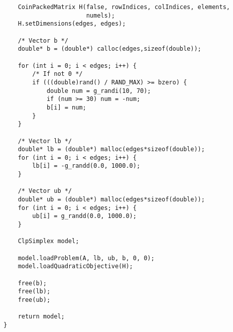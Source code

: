 \begin{verbatim}
    CoinPackedMatrix H(false, rowIndices, colIndices, elements,
                       numels);
    H.setDimensions(edges, edges);

    /* Vector b */
    double* b = (double*) calloc(edges,sizeof(double));

    for (int i = 0; i < edges; i++) {
        /* If not 0 */
        if (((double)rand() / RAND_MAX) >= bzero) {
            double num = g_randi(10, 70);
            if (num >= 30) num = -num;
            b[i] = num;
        }
    }

    /* Vector lb */
    double* lb = (double*) malloc(edges*sizeof(double));
    for (int i = 0; i < edges; i++) {
        lb[i] = -g_randd(0.0, 1000.0);
    }

    /* Vector ub */
    double* ub = (double*) malloc(edges*sizeof(double));
    for (int i = 0; i < edges; i++) {
        ub[i] = g_randd(0.0, 1000.0);
    }

    ClpSimplex model;

    model.loadProblem(A, lb, ub, b, 0, 0);
    model.loadQuadraticObjective(H);

    free(b);
    free(lb);
    free(ub);

    return model;
}
\end{verbatim}
